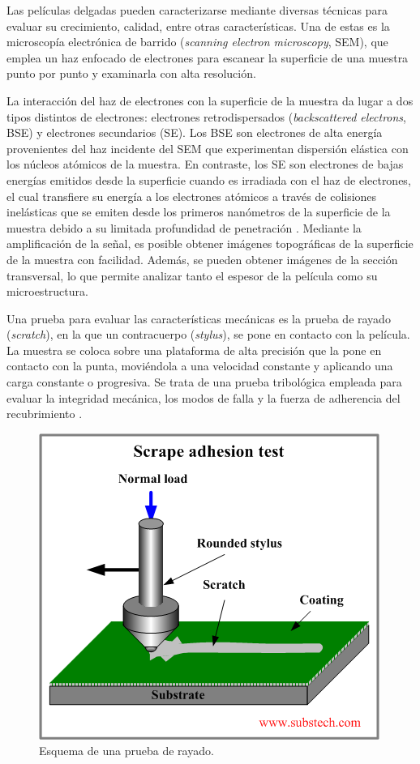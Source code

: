 \documentclass[12pt]{IEEEtran}
\begin{document}
Las películas delgadas pueden caracterizarse mediante diversas técnicas para evaluar su crecimiento, calidad, entre otras características. Una de estas es la microscopía electrónica de barrido (\emph{scanning electron microscopy}, SEM), que emplea un haz enfocado de electrones para escanear la superficie de una muestra punto por punto y examinarla con alta resolución.

La interacción del haz de electrones con la superficie de la muestra da lugar a dos tipos distintos de electrones: electrones retrodispersados (\emph{backscattered electrons}, BSE) y electrones secundarios (SE). Los BSE son electrones de alta energía provenientes del haz incidente del SEM que experimentan dispersión elástica con los núcleos atómicos de la muestra. En contraste, los SE son electrones de bajas energías emitidos desde la superficie cuando es irradiada con el haz de electrones, el cual transfiere su energía a los electrones atómicos a través de colisiones inelásticas que se emiten desde los primeros nanómetros de la superficie de la muestra debido a su limitada profundidad de penetración \cite{WhichElectronDetector2023,infoInterpretingImagesScanning2022}.
Mediante la amplificación de la señal, es posible obtener imágenes topográficas de la superficie de la muestra con facilidad. Además, se pueden obtener imágenes de la sección transversal, lo que permite analizar tanto el espesor de la película como su microestructura.

Una prueba para evaluar las características mecánicas es la prueba de rayado (\emph{scratch}), en la que un contracuerpo (\emph{stylus}), se pone en contacto con la película. La muestra se coloca sobre una plataforma de alta precisión que la pone en contacto con la punta, moviéndola a una velocidad constante y aplicando una carga constante o progresiva. Se trata de una prueba tribológica empleada para evaluar la integridad mecánica, los modos de falla y la fuerza de adherencia del recubrimiento \cite{internationalStandardTestMethod}.

\begin{figure}[htp]
	\centering
	\includegraphics[width=0.8\linewidth]{scratch-test}
	\caption{Esquema de una prueba de rayado. \cite{kopeliovich_adhesion_nodate}}
	\label{fig:scratch-test}
\end{figure}
\end{document}
